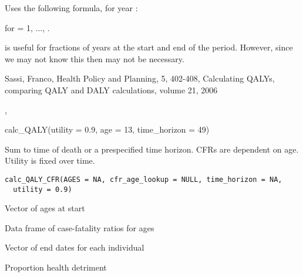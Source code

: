 \documentclass[a4paper]{book}
\begin{document}
%
\begin{Details}\relax
Uses the following formula, for year  :


for   = 1, ..., .

 is useful for fractions of years at the start and end of the period.
However, since we may not know this then may not be necessary.
\end{Details}
%
\begin{References}\relax
Sassi, Franco, Health Policy and Planning, 5, 402-408, Calculating QALYs,
comparing QALY and DALY calculations, volume 21, 2006
\end{References}
%
\begin{SeeAlso}\relax
{},
\end{SeeAlso}
%
\begin{Examples}
\begin{ExampleCode}
calc_QALY(utility = 0.9, age = 13, time_horizon = 49)

\end{ExampleCode}
\end{Examples}
%
\begin{Description}\relax
Sum to time of death or a prespecified time horizon.
CFRs are dependent on age.
Utility is fixed over time.
\end{Description}
%
\begin{Usage}
\begin{verbatim}
calc_QALY_CFR(AGES = NA, cfr_age_lookup = NULL, time_horizon = NA,
  utility = 0.9)
\end{verbatim}
\end{Usage}
%
\begin{Arguments}
\begin{ldescription}
\item[\code{AGES}] Vector of ages at start

\item[\code{cfr\_age\_lookup}] Data frame of case-fatality ratios for ages

\item[\code{time\_horizon}] Vector of end dates for each individual

\item[\code{utility}] Proportion health detriment
\end{ldescription}
\end{Arguments}
\end{document}
